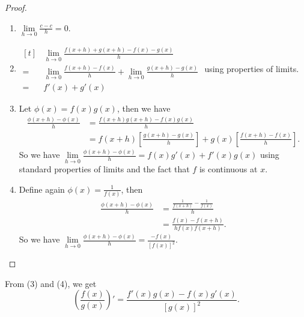 \begin{proof}
    \leavevmode
    \begin{enumerate}
        \item \(\lim\limits_{h \to 0} \frac{c-c}{h} = 0\).
        \item \(\begin{aligned}[t]
            &\lim\limits_{h \to 0} \frac{f(x+h) + g(x+h) - f(x) - g(x)}{h}\\
        =& \lim\limits_{h \to 0} \frac{f(x+h)-f(x)}{h} + \lim\limits_{h \to 0} \frac{g(x+h) - g(x)}{h}\\ =& f'(x) + g'(x)\end{aligned}\) using properties of limits.
        \item Let \(\phi(x) = f(x)g(x)\), then we have
        \begin{align*}
            \frac{\phi(x + h) - \phi(x)}{h} &= \frac{f(x+h)g(x+h) - f(x)g(x)}{h}\\
            &= f(x + h)[\frac{g(x+h)-g(x)}{h}] + g(x)[\frac{f(x+h)-f(x)}{h}].
        \end{align*}
        So we have \(\lim\limits_{h \to 0} \frac{\phi(x + h) - \phi(x)}{h} = f(x)g'(x) + f'(x)g(x)\) using standard properties of limits and the fact that \(f\) is continuous at \(x\).
        \item Define again \(\phi(x) = \frac{1}{f(x)}\), then
        \begin{align*}
            \frac{\phi(x + h) - \phi(x)}{h} &= \frac{\frac{1}{f(x + h)} - \frac{1}{f(x)}}{h}\\
            &= \frac{f(x) - f(x+h)}{hf(x)f(x+h)}.
        \end{align*}
        So we have \(\lim\limits_{h \to 0} \frac{\phi(x+h) - \phi(x)}{h} = \frac{-f(x)}{[f(x)]^2}\).
    \end{enumerate}
\end{proof}
\begin{remark}
    From (3) and (4), we get
    \[
        \left(\frac{f(x)}{g(x)}\right)' = \frac{f'(x)g(x) - f(x)g'(x)}{[g(x)]^2}.
    \] 
\end{remark}